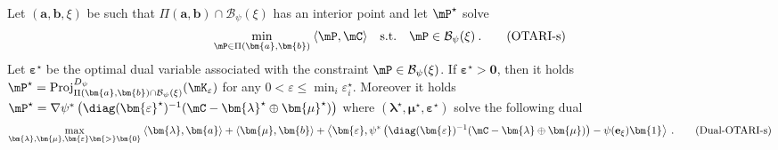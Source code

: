 \begin{proposition}
    Let $(\bm{a}, \bm{b}, \xi)$ be such that $\Pi(\bm{a}, \bm{b}) \cap \mathcal{B}_\psi(\xi)$ has an interior point and let $\mP^\star$ solve
    \begin{align}
      \min_{\mP \in \Pi(\bm{a}, \bm{b})} \: \langle \mP, \mC \rangle \quad \text{s.t.} \quad  \mP \in \mathcal{B}_\psi(\xi) \:.
      \tag{OTARI-s}
  \end{align}
  Let $\bm{\varepsilon}^\star$ be the optimal dual variable associated with the constraint $\mP \in \mathcal{B}_\psi(\xi)$.
  If $\bm{\varepsilon}^\star \bm{>} \bm{0}$, then it holds $\mP^\star = \operatorname{Proj}^{D_\psi}_{\Pi(\bm{a}, \bm{b}) \cap \mathcal{B}_\psi(\xi)}(\mK_\varepsilon)$ for any $0 < \varepsilon \leq \min_i{\varepsilon_i^\star}$. Moreover it holds $\mP^\star = \nabla \psi^* \left(\diag(\bm{\varepsilon}^\star)^{-1} (\mC - \bm{\lambda}^\star \oplus \bm{\mu}^\star) \right)$ where $(\bm{\lambda}^\star, \bm{\mu}^\star, \bm{\varepsilon}^\star)$ solve the following dual
  \begin{align}
    \max_{\bm{\lambda}, \bm{\mu}, \bm{\varepsilon} \bm{>} \bm{0}} \: \langle \bm{\lambda}, \bm{a} \rangle + \langle \bm{\mu}, \bm{b} \rangle + \left\langle \bm{\varepsilon}, \psi^*\left(\diag(\bm{\varepsilon})^{-1} (\mC - \bm{\lambda} \oplus \bm{\mu}) \right) - \psi(\mathbf{e}_\xi) \bm{1}  \right\rangle \:.
    \tag{Dual-OTARI-s}
  \end{align}
\end{proposition}

